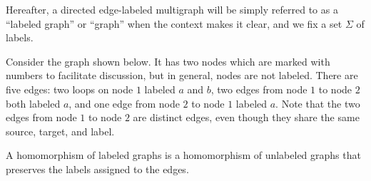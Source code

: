     Hereafter, a directed edge-labeled multigraph will be simply referred to as a \enquote{labeled graph} or \enquote{graph} when the context makes it clear, and we fix a set $\Sigma$ of labels.



\begin{example}
    Consider the graph shown 
    below.
    It has two nodes which are marked with numbers to facilitate discussion, but in general, nodes are not labeled.
    There are five edges: two loops on node $1$ labeled \(a\) and \(b\), two edges from node $1$ to node $2$ both labeled \(a\), and one edge from node $2$ to node $1$ labeled \(a\). Note that the two edges from node $1$ to node $2$ are distinct edges, even though they share the same source, target, and label.

    \begin{center}
    \end{center}


\end{example}
  A homomorphism of labeled graphs is a homomorphism of unlabeled graphs that preserves the labels assigned to the edges. 
